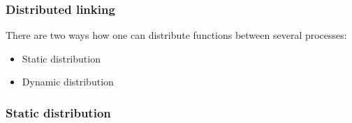 
\begin{frame}
\frametitle{Distributed linking}
There are two ways how one can distribute functions between several processes:
	\begin{itemize}
		\item Static distribution
		\item Dynamic distribution
	\end{itemize}
\end{frame}


\begin{frame}
\frametitle{Static distribution}

\end{frame}